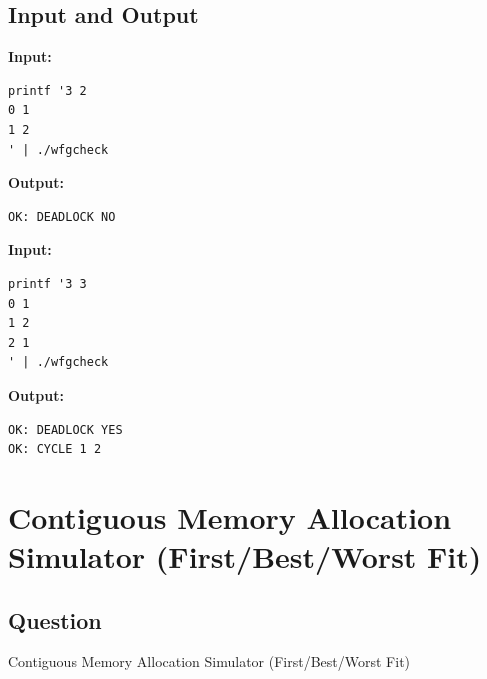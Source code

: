 \documentclass[12pt,a4paper]{article}
\begin{document}
\subsection{Input and Output}
\noindent\textbf{Input:}
\begin{verbatim}
printf '3 2
0 1
1 2
' | ./wfgcheck
\end{verbatim}
\vspace{0.5cm}
\noindent\textbf{Output:}
\begin{verbatim}
OK: DEADLOCK NO
\end{verbatim}
\noindent\textbf{Input:}
\begin{verbatim}
printf '3 3
0 1
1 2
2 1
' | ./wfgcheck
\end{verbatim}
\vspace{0.5cm}
\noindent\textbf{Output:}
\begin{verbatim}
OK: DEADLOCK YES
OK: CYCLE 1 2
\end{verbatim}
\newpage
\section{Contiguous Memory Allocation Simulator (First/Best/Worst
Fit)}
\subsection{Question}
Contiguous Memory Allocation Simulator (First/Best/Worst
Fit)
\end{document}
